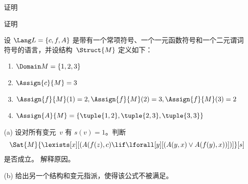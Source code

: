 \documentclass[../../../include/open-logic-section]{subfiles}
\begin{document}



\begin{prob}
  证明 
\end{prob}


\tagendprob




\begin{prob}
  证明 
\end{prob}


\tagendprob

\begin{prob}
设 $\Lang L = \{c, f, A\}$ 是带有一个常项符号、一个一元函数符号和一个二元谓词符号的语言，并设结构~$\Struct{M}$ 定义如下：
\begin{enumerate}
\item $\Domain M = \{1, 2, 3\}$
\item $\Assign{c}{M} = 3$
\item $\Assign{f}{M}(1) = 2, \Assign{f}{M}(2) = 3, \Assign{f}{M}(3) = 2$
\item $\Assign{A}{M} = \{\tuple{1, 2}, \tuple{2, 3}, \tuple{3, 3}\}$
\end{enumerate}
(a) 设对所有变元~$v$ 有 $s(v) = 1$。判断 \[
\Sat{M}{\lexists[x][(A(f(z), c) \lif \lforall[y][(A(y, x) \lor A(f(y),
      x))])]}[s]
\] 是否成立。
解释原因。

(b) 给出另一个结构和变元指派，使得该公式不被满足。
\end{prob}
\end{document}
